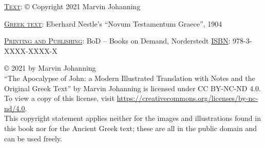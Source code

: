 \thispagestyle{empty}
\vspace*{\fill}
\noindent\textsc{\underline{Text}}: © Copyright 2021 Marvin Johanning

\noindent\textsc{\underline{Greek text}}: Eberhard Nestle's ``Novum Testamentum Graece'', 1904


\noindent\textsc{\underline{Printing and Publishing}}: BoD – Books on Demand, Norderstedt
\noindent\textsc{\underline{ISBN}}: 978-3-XXXX-XXXX-X

\bigskip

\noindent© 2021 by Marvin Johanning \ccbyncnd\\``The Apocalypse of John: a Modern Illustrated Translation with Notes and the Original Greek Text'' by Marvin Johanning is licensed under CC BY-NC-ND 4.0. To view a copy of this license, visit \url{https://creativecommons.org/licenses/by-nc-nd/4.0}.\\This copyright statement applies neither for the images and illustrations found in this book nor for the Ancient Greek text; these are all in the public domain and can be used freely.

\vspace{30mm}
\noindent{}
\newpage